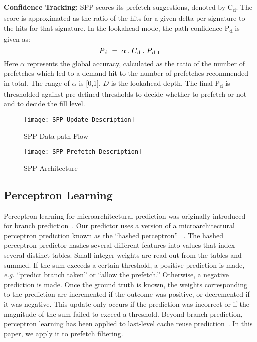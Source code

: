\noindent \textbf{Confidence Tracking:} 
SPP scores its prefetch suggestions, denoted by C\textsubscript{d}.
The score is approximated as the ratio of the hits for a given delta per
signature to the hits for that signature. In the lookahead mode, the path
confidence P\textsubscript{d} is given as: $$P\textsubscript{d} \;=\; \alpha  
\;.\;  C\textsubscript{d}  \;.\; P\textsubscript{d-1}$$ Here $\alpha$ represents 
the global accuracy, calculated as the ratio of the number of prefetches which 
led to a demand hit to the number of prefetches recommended in total. The range
of $\alpha$ is [0,1].  $D$ is the lookahead depth. The final P\textsubscript{d} 
is thresholded against pre-defined thresholds to decide whether to prefetch or 
not and to decide the fill level.

\begin{figure}
  \begin{center}
  \texttt{[image: SPP\_Update\_Description]}
  \caption{SPP Data-path Flow}
  \label{fig:spp_update}
  \end{center}
\end{figure}


\begin{figure}
  \begin{center}
  \texttt{[image: SPP\_Prefetch\_Description]}
  \caption{SPP Architecture}
  \label{fig:spp_structure}
  \end{center}
\end{figure}

\subsection{Perceptron Learning}
\label{sec:Background-Perceptron}
Perceptron learning for microarchitectural prediction was originally
introduced for branch prediction~\cite{PerceptronPredictor}.
Our predictor uses a version of a microarchitectural perceptron 
prediction known as the ``hashed perceptron'' ~\cite{HashedPerceptron}. 
The hashed perceptron predictor hashes several different
features into values that index several distinct tables. Small integer
weights are read out from the tables and summed. If the sum exceeds
a certain threshold, a positive prediction is made, {\em e.g.} ``predict
branch taken'' or ``allow the prefetch.'' Otherwise, a negative
prediction is made. Once the ground truth is known, the weights
corresponding to the prediction are incremented if the outcome was
positive, or decremented if it was negative. This update only occurs
if the prediction was incorrect or if the magnitude of the sum failed
to exceed a threshold.  Beyond branch prediction, perceptron learning
has been applied to last-level cache reuse
prediction~\cite{Perc_Reuse,Multiperspective}. In this paper, we apply
it to prefetch filtering.
